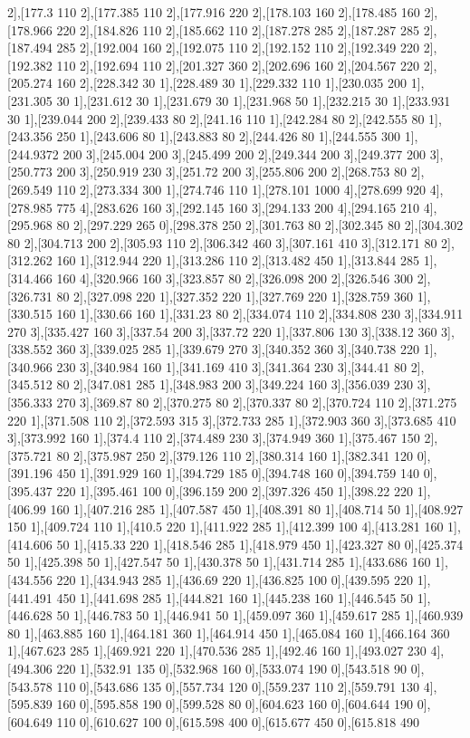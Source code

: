 {2],[177.3 110 2],[177.385 110 2],[177.916 220 2],[178.103 160 2],[178.485 160 2],[178.966 220 2],[184.826 110 2],[185.662 110 2],[187.278 285 2],[187.287 285 2],[187.494 285 2],[192.004 160 2],[192.075 110 2],[192.152 110 2],[192.349 220 2],[192.382 110 2],[192.694 110 2],[201.327 360 2],[202.696 160 2],[204.567 220 2],[205.274 160 2],[228.342 30 1],[228.489 30 1],[229.332 110 1],[230.035 200 1],[231.305 30 1],[231.612 30 1],[231.679 30 1],[231.968 50 1],[232.215 30 1],[233.931 30 1],[239.044 200 2],[239.433 80 2],[241.16 110 1],[242.284 80 2],[242.555 80 1],[243.356 250 1],[243.606 80 1],[243.883 80 2],[244.426 80 1],[244.555 300 1],[244.9372 200 3],[245.004 200 3],[245.499 200 2],[249.344 200 3],[249.377 200 3],[250.773 200 3],[250.919 230 3],[251.72 200 3],[255.806 200 2],[268.753 80 2],[269.549 110 2],[273.334 300 1],[274.746 110 1],[278.101 1000 4],[278.699 920 4],[278.985 775 4],[283.626 160 3],[292.145 160 3],[294.133 200 4],[294.165 210 4],[295.968 80 2],[297.229 265 0],[298.378 250 2],[301.763 80 2],[302.345 80 2],[304.302 80 2],[304.713 200 2],[305.93 110 2],[306.342 460 3],[307.161 410 3],[312.171 80 2],[312.262 160 1],[312.944 220 1],[313.286 110 2],[313.482 450 1],[313.844 285 1],[314.466 160 4],[320.966 160 3],[323.857 80 2],[326.098 200 2],[326.546 300 2],[326.731 80 2],[327.098 220 1],[327.352 220 1],[327.769 220 1],[328.759 360 1],[330.515 160 1],[330.66 160 1],[331.23 80 2],[334.074 110 2],[334.808 230 3],[334.911 270 3],[335.427 160 3],[337.54 200 3],[337.72 220 1],[337.806 130 3],[338.12 360 3],[338.552 360 3],[339.025 285 1],[339.679 270 3],[340.352 360 3],[340.738 220 1],[340.966 230 3],[340.984 160 1],[341.169 410 3],[341.364 230 3],[344.41 80 2],[345.512 80 2],[347.081 285 1],[348.983 200 3],[349.224 160 3],[356.039 230 3],[356.333 270 3],[369.87 80 2],[370.275 80 2],[370.337 80 2],[370.724 110 2],[371.275 220 1],[371.508 110 2],[372.593 315 3],[372.733 285 1],[372.903 360 3],[373.685 410 3],[373.992 160 1],[374.4 110 2],[374.489 230 3],[374.949 360 1],[375.467 150 2],[375.721 80 2],[375.987 250 2],[379.126 110 2],[380.314 160 1],[382.341 120 0],[391.196 450 1],[391.929 160 1],[394.729 185 0],[394.748 160 0],[394.759 140 0],[395.437 220 1],[395.461 100 0],[396.159 200 2],[397.326 450 1],[398.22 220 1],[406.99 160 1],[407.216 285 1],[407.587 450 1],[408.391 80 1],[408.714 50 1],[408.927 150 1],[409.724 110 1],[410.5 220 1],[411.922 285 1],[412.399 100 4],[413.281 160 1],[414.606 50 1],[415.33 220 1],[418.546 285 1],[418.979 450 1],[423.327 80 0],[425.374 50 1],[425.398 50 1],[427.547 50 1],[430.378 50 1],[431.714 285 1],[433.686 160 1],[434.556 220 1],[434.943 285 1],[436.69 220 1],[436.825 100 0],[439.595 220 1],[441.491 450 1],[441.698 285 1],[444.821 160 1],[445.238 160 1],[446.545 50 1],[446.628 50 1],[446.783 50 1],[446.941 50 1],[459.097 360 1],[459.617 285 1],[460.939 80 1],[463.885 160 1],[464.181 360 1],[464.914 450 1],[465.084 160 1],[466.164 360 1],[467.623 285 1],[469.921 220 1],[470.536 285 1],[492.46 160 1],[493.027 230 4],[494.306 220 1],[532.91 135 0],[532.968 160 0],[533.074 190 0],[543.518 90 0],[543.578 110 0],[543.686 135 0],[557.734 120 0],[559.237 110 2],[559.791 130 4],[595.839 160 0],[595.858 190 0],[599.528 80 0],[604.623 160 0],[604.644 190 0],[604.649 110 0],[610.627 100 0],[615.598 400 0],[615.677 450 0],[615.818 490 }
